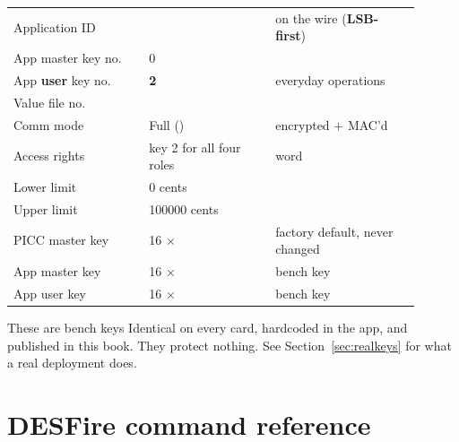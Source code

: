 \begin{center}\small
\begin{tabular}{@{}L{0.30\linewidth}L{0.28\linewidth}L{0.32\linewidth}@{}}
\toprule
{} &  &  \\
\midrule
Application ID       &    & on the wire  (\textbf{LSB-first}) \\
App master key no.   & 0 & \\
App \textbf{user} key no. & \textbf{2} & everyday operations \\
Value file no.       &  & \\
Comm mode            & Full () & encrypted $+$ MAC'd \\
Access rights        & key 2 for all four roles & word  \\
Lower limit          & 0 cents & \\
Upper limit          & 100000 cents &  \\
PICC master key      & 16 $\times$  & factory default, never changed \\
App master key       & 16 $\times$  & bench key \\
App user key         & 16 $\times$  & bench key \\
\bottomrule
\end{tabular}
\end{center}

\begin{trap}{These are bench keys}
Identical on every card, hardcoded in the app, and published in this book. They
protect nothing. See Section~\ref{sec:realkeys} for what a real deployment does.
\end{trap}

\section{DESFire command reference}

